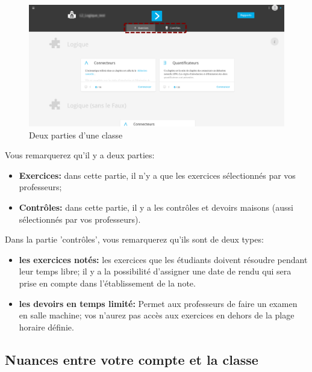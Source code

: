\documentclass[a4paper]{article}
\begin{document}
\begin{figure}[h!]
\begin{center}
\includegraphics[scale=0.1]{img_app9.png}
\end{center}
\caption{Deux parties d'une classe}\label{im:parts_classe}
\end{figure}
\FloatBarrier

Vous remarquerez qu'il y a deux parties:
\begin{itemize}
\item \textbf{Exercices:} dans cette partie, il n'y a que les exercices sélectionnés par vos professeurs;
\item \textbf{Contrôles:} dans cette partie, il y a les contrôles et devoirs maisons (aussi sélectionnés par vos professeurs).
\end{itemize}
Dans la partie 'contrôles', vous remarquerez qu'ils sont de deux types:
\begin{itemize}
\item \textbf{les exercices notés:} les exercices que les étudiants doivent résoudre pendant leur temps libre; il y a la possibilité d'assigner une date de rendu qui sera prise en compte dans l'établissement de la note.
\item \textbf{les devoirs en temps limité:} Permet aux professeurs de faire un examen en salle machine; vos n'aurez pas accès aux exercices en dehors de la plage horaire définie.
\end{itemize}



\subsection{Nuances entre votre compte et la classe}


\end{document}
